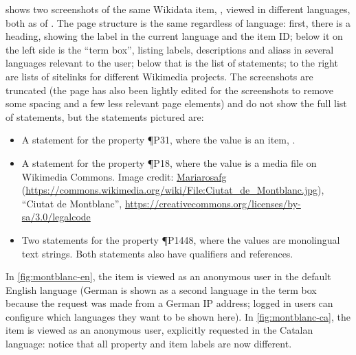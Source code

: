  shows two screenshots of the same \gls{Wikidata} \gls{item},
, viewed in different languages,
both as of .
The page structure is the same regardless of language:
first, there is a heading, showing the \gls{label} in the current language and the \gls{item ID};
below it on the left side is the “term box”,
listing \glspl{label}, \glspl{description} and \glspl{alias} in several languages relevant to the user;
below that is the list of \glspl{statement};
to the right are lists of \glspl{sitelink} for different \gls{Wikimedia} projects.
The screenshots are truncated
(the page has also been lightly edited for the screenshots
to remove some spacing and a few less relevant page elements)
and do not show the full list of \glspl{statement},
but the \glspl{statement} pictured are:
\begin{itemize}
\item A \gls{statement} for the \gls{property} \P{P31},
  where the value is an \gls{item}, .
\item A \gls{statement} for the \gls{property} \P{P18},
  where the value is a media file on \gls{Wikimedia Commons}.
  Image credit:
  \href{https://commons.wikimedia.org/wiki/User:Mariarosafg}{Mariarosafg}
  (\url{https://commons.wikimedia.org/wiki/File:Ciutat_de_Montblanc.jpg}),
  “Ciutat de Montblanc”,
  \url{https://creativecommons.org/licenses/by-sa/3.0/legalcode}
\item Two \glspl{statement} for the \gls{property} \P{P1448},
  where the values are monolingual text strings.
  Both \glspl{statement} also have \glspl{qualifier} and \glspl{reference}.
\end{itemize}
In \cref{fig:montblanc-en},
the \gls{item} is viewed as an anonymous user in the default English language
(German is shown as a second language in the term box
because the request was made from a German IP address;
logged in users can configure which languages they want to be shown here).
In \cref{fig:montblanc-ca},
the \gls{item} is viewed as an anonymous user, explicitly requested in the Catalan language:
notice that all \gls{property} and \gls{item} \glspl{label} are now different.

